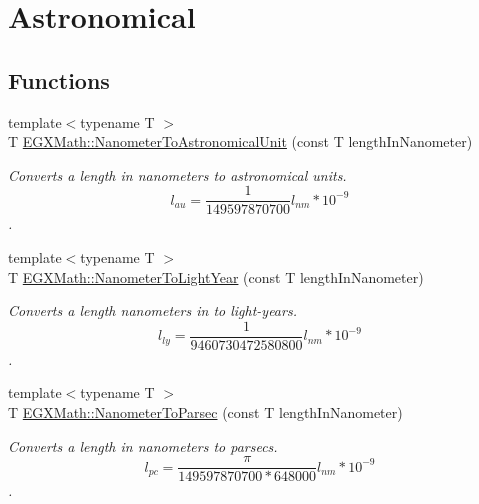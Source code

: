 \hypertarget{group___e_g_x_math-_conversions-_length_conversions-_nanometer-_astronomical}{}\section{Astronomical}
\label{group___e_g_x_math-_conversions-_length_conversions-_nanometer-_astronomical}
\subsection*{Functions}
\begin{DoxyCompactItemize}
\item 
{\footnotesize template$<$typename T $>$ }\\T \mbox{\hyperlink{group___e_g_x_math-_conversions-_length_conversions-_nanometer-_astronomical_gab45f259430dc605beef983b095325ce1}{E\+G\+X\+Math\+::\+Nanometer\+To\+Astronomical\+Unit}} (const T length\+In\+Nanometer)
\begin{DoxyCompactList}\small\item\em Converts a length in nanometers to astronomical units. \[ l_{au}= \frac{1}{149597870700} l_{nm} * 10^{-9} \]. \end{DoxyCompactList}\item 
{\footnotesize template$<$typename T $>$ }\\T \mbox{\hyperlink{group___e_g_x_math-_conversions-_length_conversions-_nanometer-_astronomical_ga9ef3d82e1ccb8e07dfb52500ff447b17}{E\+G\+X\+Math\+::\+Nanometer\+To\+Light\+Year}} (const T length\+In\+Nanometer)
\begin{DoxyCompactList}\small\item\em Converts a length nanometers in to light-\/years. \[ l_{ly}= \frac{1}{9460730472580800} l_{nm} * 10^{-9} \]. \end{DoxyCompactList}\item 
{\footnotesize template$<$typename T $>$ }\\T \mbox{\hyperlink{group___e_g_x_math-_conversions-_length_conversions-_nanometer-_astronomical_ga20e55ba8ac39aaf9b27c4092266cdcee}{E\+G\+X\+Math\+::\+Nanometer\+To\+Parsec}} (const T length\+In\+Nanometer)
\begin{DoxyCompactList}\small\item\em Converts a length in nanometers to parsecs. \[ l_{pc}=\frac{\pi}{149597870700 * 648000} l_{nm} * 10^{-9} \]. \end{DoxyCompactList}\end{DoxyCompactItemize}


